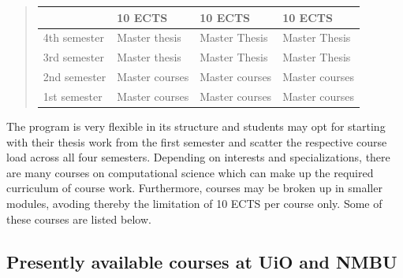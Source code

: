 \documentclass[%
oneside,                 %
final,                   %
10pt]{article}
\begin{document}
\begin{quote}
\begin{tabular}{llll}
\hline
\multicolumn{1}{l}{  } & \multicolumn{1}{l}{ 10 ECTS } & \multicolumn{1}{l}{ 10 ECTS } & \multicolumn{1}{l}{ 10 ECTS } \\
\hline
4th semester & Master thesis  & Master Thesis  & Master Thesis  \\
\hline
3rd semester & Master thesis  & Master Thesis  & Master Thesis  \\
\hline
2nd semester & Master courses & Master courses & Master courses \\
\hline
1st semester & Master courses & Master courses & Master courses \\
\hline
\end{tabular}
\end{quote}

\noindent
The program is very flexible in its structure and students may opt for starting with their thesis
work from the first semester and scatter the respective course load across all four semesters.
Depending on interests and specializations, there are many courses on computational science which can make
up the required curriculum of course work. Furthermore, courses may be broken up in smaller modules,
avoding thereby the limitation of 10 ECTS per course only. Some of these courses are listed below.



\subsection{Presently available courses at UiO and NMBU}

\paragraph{}
\end{document}

